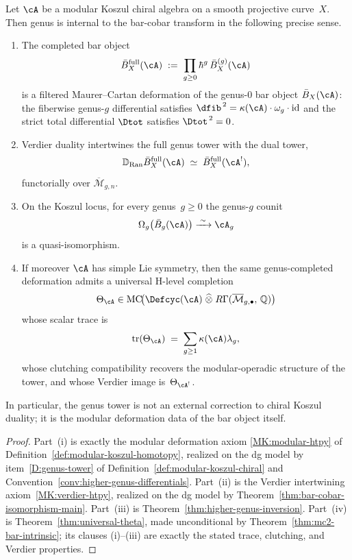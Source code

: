 \begin{theorem}
\label{thm:genus-internalization}
Let $\cA$ be a modular Koszul chiral algebra on a smooth projective
curve~$X$.  Then genus is internal to the bar-cobar transform in the
following precise sense.
\begin{enumerate}[label=\textup{(\roman*)}]
\item The completed bar object
  \[
  \bar{B}^{\mathrm{full}}_X(\cA)
  \;:=\;
  \prod_{g \geq 0}\hbar^g\,\bar{B}^{(g)}_X(\cA)
  \]
  is a filtered Maurer--Cartan deformation of the genus-$0$ bar object
  $\bar{B}_X(\cA)$: the fiberwise genus-$g$ differential satisfies
  $\dfib^{\,2} = \kappa(\cA)\cdot\omega_g\cdot\operatorname{id}$ and the
  strict total differential $\Dtot$ satisfies $\Dtot^{\,2} = 0$.
\item Verdier duality intertwines the full genus tower with the dual
  tower,
  \[
  \mathbb{D}_{\operatorname{Ran}}\bar{B}^{\mathrm{full}}_X(\cA)
  \;\simeq\;
  \bar{B}^{\mathrm{full}}_X(\cA^!),
  \]
  functorially over $\overline{\mathcal{M}}_{g,n}$.
\item On the Koszul locus, for every genus~$g \geq 0$ the genus-$g$
  counit
  \[
  \Omega_g\bigl(\bar{B}_g(\cA)\bigr)
  \xrightarrow{\;\sim\;}
  \cA_g
  \]
  is a quasi-isomorphism.
\item If moreover $\cA$ has simple Lie symmetry, then the same
  genus-completed deformation admits a universal H-level completion
  \[
  \Theta_{\cA} \in
  \operatorname{MC}\!\bigl(
    \Defcyc(\cA) \;\widehat{\otimes}\;
    R\Gamma(\overline{\mathcal{M}}_{g,\bullet},\, \mathbb{Q})
  \bigr)
  \]
  whose scalar trace is
  \[
  \operatorname{tr}(\Theta_{\cA})
  \;=\;
  \sum_{g \geq 1} \kappa(\cA)\lambda_g,
  \]
  whose clutching compatibility recovers the modular-operadic structure
  of the tower, and whose Verdier image is~$\Theta_{\cA^!}$.
\end{enumerate}
In particular, the genus tower is not an external correction to chiral
Koszul duality; it is the modular deformation data of the bar object
itself.
\end{theorem}

\begin{proof}
Part~\textup{(i)} is exactly the modular deformation axiom
\textup{\ref{MK:modular-htpy}} of
Definition~\ref{def:modular-koszul-homotopy}, realized on the dg model
by item~\textup{\ref{D:genus-tower}} of
Definition~\ref{def:modular-koszul-chiral} and
Convention~\ref{conv:higher-genus-differentials}.  Part~\textup{(ii)} is
the Verdier intertwining axiom~\textup{\ref{MK:verdier-htpy}}, realized
on the dg model by
Theorem~\ref{thm:bar-cobar-isomorphism-main}.  Part~\textup{(iii)} is
Theorem~\ref{thm:higher-genus-inversion}.  Part~\textup{(iv)} is
Theorem~\ref{thm:universal-theta}, made unconditional by
Theorem~\ref{thm:mc2-bar-intrinsic}; its clauses
\textup{(i)}--\textup{(iii)} are exactly the stated trace, clutching,
and Verdier properties.
\end{proof}

